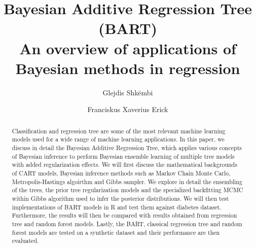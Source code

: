 \documentclass{usiinftr}
\begin{document}
\title{\bf Bayesian Additive Regression Tree (BART) \\ {\normalfont An overview of applications of Bayesian methods in regression }}
\author{Glejdis Shk\"embi}{\dagger}
\author{Franciskus Xaverius Erick}{\dagger}


%
%

\maketitle

\begin{abstract}
Classification and regression tree are some of the most relevant machine learning models used for a wide range of machine learning applications. In this paper, we discuss in detail the Bayesian Additive Regression Tree, which applies various concepts of Bayesian inference to perform Bayesian ensemble learning of multiple tree models with added regularization effects. We will first discuss the mathematical backgrounds of CART models, Bayesian inference methods such as Markov Chain Monte Carlo, Metropolis-Hastings algoirthm and Gibbs sampler. We explore in detail the ensembling of the trees, the prior tree regularization models and the specialized backfitting MCMC within Gibbs algorithm used to infer the posterior distributions. We will then test implementations of BART models in R and test them against diabetes dataset. Furthermore, the results will then be compared with results obtained from regression tree and random forest models. Lastly, the BART, classical regression tree and random forest models are tested on a synthetic dataset and their performance are then evaluated.
\end{abstract}
\end{document}
